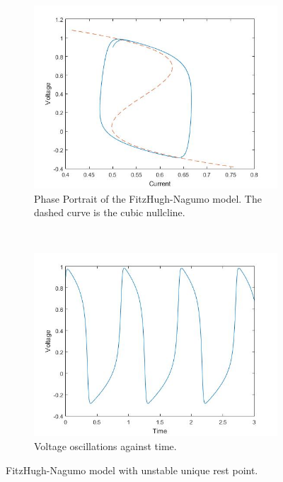 \documentclass[a4paper]{article}
\begin{document}
\begin{figure}[h!]
    \centering
    \begin{subfigure}[t]{0.49\textwidth}
        \includegraphics[width=\textwidth]{fitz_nagumo_hysteresis}
        \caption{Phase Portrait of the FitzHugh-Nagumo model. The dashed curve is the cubic nullcline.}
        \label{fitz_nagumo_hysteresis}
    \end{subfigure}
    ~ %
    \begin{subfigure}[t]{0.49\textwidth}
        \includegraphics[width=\textwidth]{fitz_nagumo}
        \caption{Voltage oscillations against time.}
        \label{f_n}
    \end{subfigure}
\caption{FitzHugh-Nagumo model with unstable unique rest point.}
\label{fitz-nagumo}
\end{figure}
\end{document}
